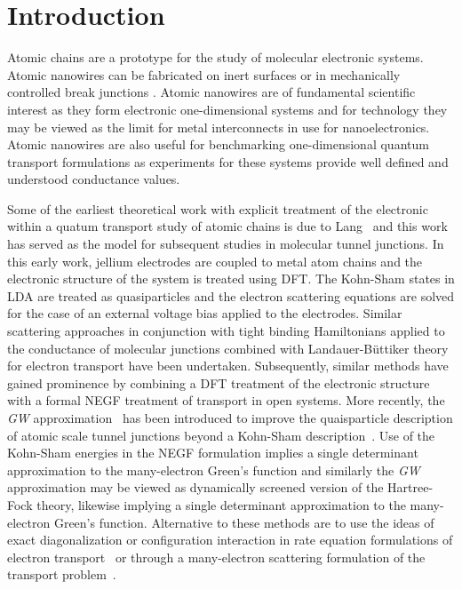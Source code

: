 \section{Introduction}

Atomic chains are a prototype for the study of
molecular electronic systems. Atomic nanowires can be fabricated on
inert surfaces \cite{segovia1999nature,nilius2002science} or in
mechanically controlled break junctions \cite{vanruitenbeek1998mcbj}.
Atomic nanowires are of fundamental scientific interest as they form
electronic one-dimensional systems and for technology they may be viewed
as the limit for metal interconnects in use for nanoelectronics.  Atomic
nanowires are also useful for benchmarking one-dimensional quantum
transport formulations as experiments for these systems provide well
defined and understood conductance values.

Some of the earliest theoretical work with explicit treatment of the
electronic within a quatum transport study of atomic chains is due to
Lang~\cite{Lang1995prb} and this work has served as the model for
subsequent studies in molecular tunnel junctions. In this early work,
jellium electrodes are coupled to metal atom chains and the electronic
structure of the system is treated using \ac{DFT}. The Kohn-Sham states
in \ac{LDA} are treated as quasiparticles and the electron
scattering equations are solved for the case of an external voltage bias
applied to the electrodes. Similar scattering approaches in conjunction
with tight binding Hamiltonians applied to the conductance of molecular
junctions combined with Landauer-B\"uttiker theory for electron transport
\cite{emberlykirczenow1999standingwave,
emberlykirczenow2000molecularwire} have been undertaken. 
Subsequently, similar methods have gained prominence by combining a \ac{DFT}
treatment of the electronic structure with a formal \ac{NEGF} treatment of
transport in open systems. More recently, the {\it GW}
approximation~\cite{hedin1965gw} has been introduced to improve  the
quaisparticle description of atomic scale tunnel junctions beyond a Kohn-Sham
description~\cite{thygesen_rubio,neaton2007amines}.  Use of the
Kohn-Sham energies in the NEGF formulation implies a single determinant
approximation to the many-electron Green's function and similarly the
{\it GW} approximation may be viewed as dynamically screened version of
the Hartree-Fock theory, likewise implying a single determinant
approximation to the many-electron Green's function.  Alternative to
these methods are to use the ideas of exact diagonalization or
configuration interaction in rate equation formulations of electron
transport~\cite{pedersen_many_body_tunneling} or through a many-electron
scattering formulation of the transport problem~\cite{vici2004}. 

